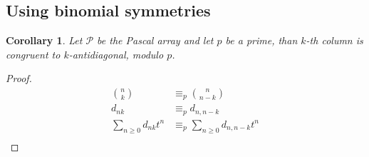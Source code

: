 \documentclass[10pt,a4paper]{article} %
\newtheorem{corollary}[theorem]{Corollary}
\begin{document}
    \subsection{Using binomial symmetries}

    \begin{corollary}
    Let $\mathcal{P}$ be the Pascal array and let $p$ be a prime, than $k$-th column 
    is congruent to $k$-antidiagonal, modulo $p$.
    \end{corollary}
    \begin{proof}
        \begin{displaymath}
            \begin{split}
                { {n} \choose {k} } &\equiv_{p} { {n} \choose {n-k} } \\
                d_{nk} &\equiv_{p} d_{n,n-k}\\
                \sum_{n\geq 0}{d_{nk} t^n} &\equiv_{p}\sum_{n\geq 0}{d_{n,n-k} t^n} \\
            \end{split}
        \end{displaymath}
    \end{proof}
\end{document}
